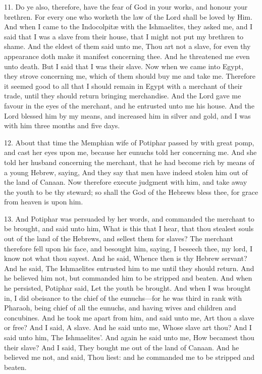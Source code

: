11. Do ye also, therefore, have the fear of God in your works, and honour your brethren. For every one who worketh the law of the Lord shall be loved by Him. And when I came to the Indocolpitæ with the Ishmaelites, they asked me, and I said that I was a slave from their house, that I might not put my brethren to shame. And the eldest of them said unto me, Thou art not a slave, for even thy appearance doth make it manifest concerning thee. And he threatened me even unto death. But I said that I was their slave. Now when we came into Egypt, they strove concerning me, which of them should buy me and take me. Therefore it seemed good to all that I should remain in Egypt with a merchant of their trade, until they should return bringing merchandise. And the Lord gave me favour in the eyes of the merchant, and he entrusted unto me his house. And the Lord blessed him by my means, and increased him in silver and gold, and I was with him three months and five days.

12. About that time the Memphian wife of Potiphar passed by with great pomp, and cast her eyes upon me, because her eunuchs told her concerning me. And she told her husband concerning the merchant, that he had become rich by means of a young Hebrew, saying, And they say that men have indeed stolen him out of the land of Canaan. Now therefore execute judgment with him, and take away the youth to be thy steward; so shall the God of the Hebrews bless thee, for grace from heaven is upon him.

13. And Potiphar was persuaded by her words, and commanded the merchant to be brought, and said unto him, What is this that I hear, that thou stealest souls out of the land of the Hebrews, and sellest them for slaves? The merchant therefore fell upon his face, and besought him, saying, I beseech thee, my lord, I know not what thou sayest. And he said, Whence then is thy Hebrew servant? And he said, The Ishmaelites entrusted him to me until they should return. And he believed him not, but commanded him to be stripped and beaten. And when he persisted, Potiphar said, Let the youth be brought. And when I was brought in, I did obeisance to the chief of the eunuchs—for he was third in rank with Pharaoh, being chief of all the eunuchs, and having wives and children and concubines. And he took me apart from him, and said unto me, Art thou a slave or free? And I said, A slave. And he said unto me, Whose slave art thou? And I said unto him, The Ishmaelites’. And again he said unto me, How becamest thou their slave? And I said, They bought me out of the land of Canaan. And he believed me not, and said, Thou liest: and he commanded me to be stripped and beaten.

